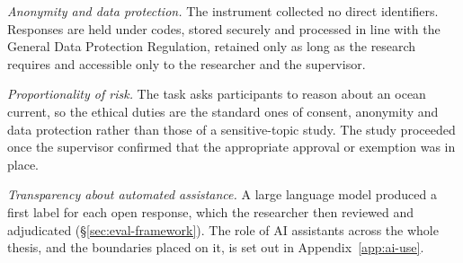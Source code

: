 \emph{Anonymity and data protection.} The instrument collected no direct identifiers. Responses
are held under codes, stored securely and processed in line with the General Data Protection
Regulation, retained only as long as the research requires and accessible only to the
researcher and the supervisor.

\emph{Proportionality of risk.} The task asks participants to reason about an ocean current,
so the ethical duties are the standard ones of consent, anonymity and data protection rather
than those of a sensitive-topic study. The study proceeded once the supervisor confirmed that
the appropriate approval or exemption was in place.

\emph{Transparency about automated assistance.} A large language model produced a first label
for each open response, which the researcher then reviewed and adjudicated
(\S\ref{sec:eval-framework}). The role of AI assistants across the whole thesis, and the
boundaries placed on it, is set out in Appendix~\ref{app:ai-use}.
